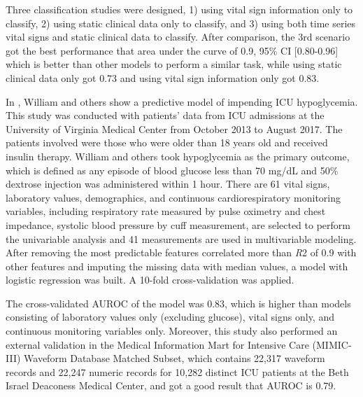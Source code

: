 \documentclass[12pt,a4paper,english
]{tunithesis}
\begin{document}
Three classification studies were designed, 1) using vital sign information only to classify, 2) using static clinical data only to classify, and 3) using both time series vital signs and static clinical data to classify. After comparison, the 3rd scenario got the best performance that area under the curve of 0.9, 95\% CI [0.80-0.96] which is better than other models to perform a similar task, while using static clinical data only got 0.73 and using vital sign information only got 0.83.

In \textcite{horton2022}, William and others show a predictive model of impending ICU hypoglycemia. This study was conducted with patients' data from ICU admissions at the University of Virginia Medical Center from October 2013 to August 2017. The patients involved were those who were older than 18 years old and received insulin therapy. William and others took hypoglycemia as the primary outcome, which is defined as any episode of blood glucose less than 70 mg/dL and 50\% dextrose injection was administered within 1 hour. There are 61 vital signs, laboratory values, demographics, and continuous cardiorespiratory monitoring variables, including respiratory rate measured by pulse oximetry and chest impedance, systolic blood pressure by cuff measurement, are selected to perform the univariable analysis and 41 measurements are used in multivariable modeling. After removing the most predictable features correlated more than \textit{R}2 of 0.9 with other features and imputing the missing data with median values, a model with logistic regression was built. A 10-fold cross-validation was applied. 

The cross-validated AUROC of the model was 0.83, which is higher than models consisting of laboratory values only (excluding glucose), vital signs only, and continuous monitoring variables only. Moreover, this study also performed an external validation in the Medical Information Mart for Intensive Care (MIMIC-III) Waveform Database Matched Subset, which contains 22,317 waveform records and 22,247 numeric records for 10,282 distinct ICU patients at the Beth Israel Deaconess Medical Center, and got a good result that AUROC is 0.79.
\end{document}
